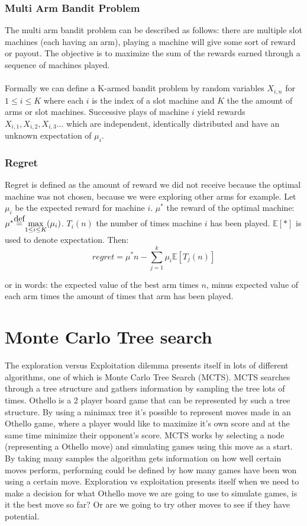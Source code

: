 \documentclass[10pt,letterpaper]{article}
\newcommand\defeq{\stackrel{\mathclap{\normalfont\mbox{def}}}{=}}
\newcommand\IE{\mathbb{E}}
\begin{document}
\subsubsection{Multi Arm Bandit Problem}
The multi arm bandit problem can be described as follows: there are multiple slot machines (each having an arm), playing a machine will give some sort of reward or payout. The objective is to maximize the sum of the rewards earned through a sequence of machines played.\\\\

Formally we can define a K-armed bandit problem by random variables $X_{i,n}$ for $1 \leq i \leq K$ where each $i$ is the index of a slot machine and $K$ the the amount of arms or slot machines. Successive plays of machine $i$ yield rewards $X_{i,1},X_{i,2},X_{i,3}...$ which are independent, identically distributed and have an unknown expectation of $\mu_i$.
\subsubsection{Regret}
Regret is defined as the amount of reward we did not receive because the optimal machine was not chosen, because we were exploring other arms for example. Let $\mu_i$ be the expected reward for machine $i$. $\mu^{*}$ the reward of the optimal machine: $\mu^{*} \defeq \max\limits_{1 \leq i \leq K} (\mu_i)$. $T_i(n)$ the number of times machine $i$ has been played. $\IE[*]$ is used to denote expectation. Then:
\[
    regret = \mu^*n - \sum_{j=1}^{k}\mu_i\IE[T_j(n)]
\]

or in words: the expected value of the best arm times $n$, minus expected value of each arm times the amount of times that arm has been played.

\section{Monte Carlo Tree search}
The exploration versus Exploitation dilemma presents itself in lots of different algorithms, one of which is Monte Carlo Tree Search (MCTS). MCTS searches through a tree structure and gathers information by sampling the tree lots of times. Othello is a 2 player board game that can be represented by such a tree structure. By using a minimax tree it's possible to represent moves made in an Othello game, where a player would like to maximize it's own score and at the same time minimize their opponent's score. MCTS works by selecting a node (representing a Othello move) and simulating games using this move as a start. By taking many samples the algorithm gets information on how well certain moves perform, performing could be defined by how many games have been won using a certain move. Exploration vs exploitation presents itself when we need to make a decision for what Othello move we are going to use to simulate games, is it the best move so far? Or are we going to try other moves to see if they have potential.
\end{document}
